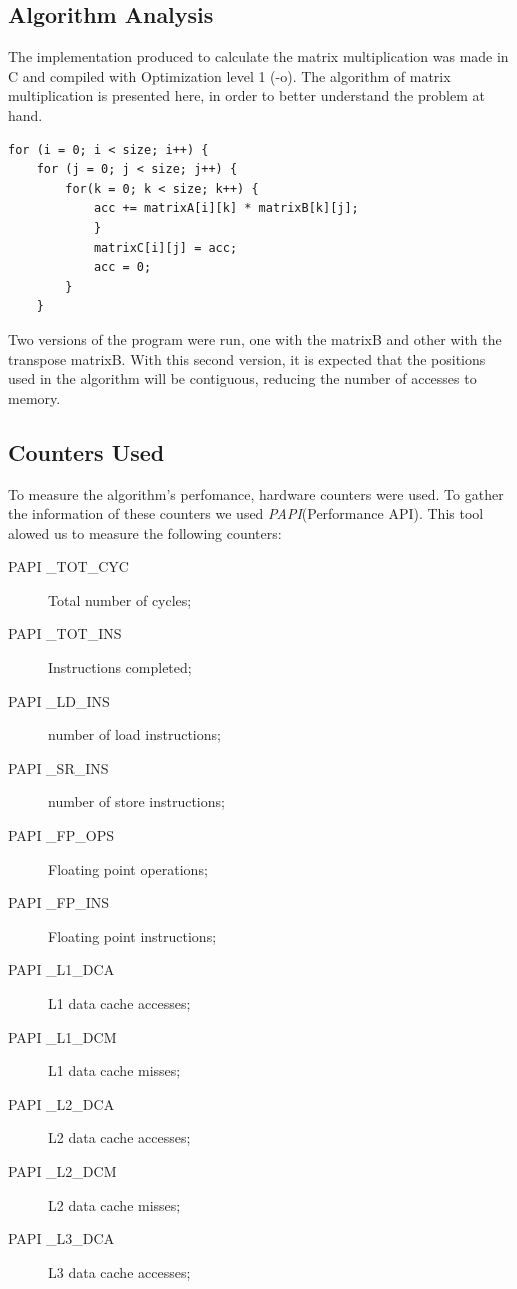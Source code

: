 \documentclass[a4paper,10pt,openright,openbib]{article}
\begin{document}
\subsection{Algorithm Analysis}
The implementation produced to calculate the matrix multiplication was made in C and compiled with Optimization level 1 (-o).
The algorithm of matrix multiplication is presented here, in order to better understand the problem at hand.

\begin{verbatim}
for (i = 0; i < size; i++) {
    for (j = 0; j < size; j++) {
        for(k = 0; k < size; k++) {
            acc += matrixA[i][k] * matrixB[k][j];				
            }		
            matrixC[i][j] = acc;	
            acc = 0;
        }
    }
\end{verbatim}

Two versions of the program were run, one with the matrixB and other with the transpose matrixB. With this second version, it is expected that the positions used in the algorithm will be contiguous, reducing the number of accesses to memory. 

\subsection{Counters Used}
To measure the algorithm's perfomance, hardware counters were used. To gather the information of these counters we used \emph{PAPI}(Performance API). This tool alowed us to measure the following counters:
\begin{description}
\item[PAPI \_TOT\_CYC] Total number of cycles;
\item[PAPI \_TOT\_INS] Instructions completed;
\item[PAPI \_LD\_INS] number of load instructions;
\item[PAPI \_SR\_INS] number of store instructions;
\item[PAPI \_FP\_OPS] Floating point operations;
\item[PAPI \_FP\_INS] Floating point instructions;
\item[PAPI \_L1\_DCA] L1 data cache accesses;
\item[PAPI \_L1\_DCM] L1 data cache misses;
\item[PAPI \_L2\_DCA] L2 data cache accesses;
\item[PAPI \_L2\_DCM] L2 data cache misses;
\item[PAPI \_L3\_DCA] L3 data cache accesses;
\end{description}
\end{document}
